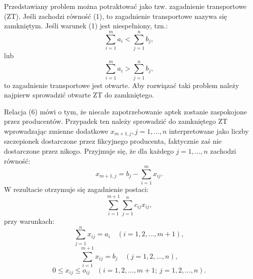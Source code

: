 \documentclass[11pt]{article}
\begin{document}
Przedstawiany problem można potraktować jako tzw. zagadnienie transportowe (ZT). Jeśli zachodzi równość (1), to zagadnienie transportowe nazywa się zamkniętym.
Jeśli warunek (1) jest niespełniony, tzn.:
\begin{equation}
    \sum\limits_{i=1}^{m} a_{i} < \sum\limits_{j=1}^n b_{j},
\end{equation}
lub
\begin{equation}
    \sum\limits_{i=1}^{m} a_{i} > \sum\limits_{j=1}^n b_{j},
\end{equation}
to zagadnienie transportowe jest otwarte. Aby rozwiązać taki problem należy najpierw sprowadzić otwarte ZT do zamkniętego.

Relacja (6) mówi o tym, że niecałe zapotrzebowanie aptek zostanie zaspokojone przez producentów. Przypadek ten należy sprowadzić do zamkniętego ZT wprowadzając zmienne dodatkowe $x_{m+1,j}, j = 1,..., n$ interpretowane jako liczby szczepionek dostarczone przez fikcyjnego producenta, faktycznie zaś nie dostarczone przez nikogo. Przyjmuje się, że dla każdego $j=1,..., n$ zachodzi równość:
\begin{equation}
    x_{m+1,j}=b_{j}-\sum\limits_{i=1}^{m} x_{ij}.
\end{equation}
W rezultacie otrzymuje się zagadnienie postaci:
\begin{equation}
    \sum\limits_{i=1}^{m+1}\sum\limits_{j=1}^{n}c_{ij}x_{ij},
\end{equation}
przy warunkach:
\begin{equation}
    \sum\limits_{j=1}^{n} x_{ij} = a_{i} \quad (i = 1, 2,..., m+1),
\end{equation}
\begin{equation}
    \sum\limits_{i=1}^{m+1} x_{ij} = b_{j} \quad (j = 1, 2,..., n),
\end{equation}
\begin{equation}
    0 \leq x_{ij} \leq o_{ij} \quad (i = 1, 2,..., m+1; \ j = 1, 2,..., n).
\end{equation}
\end{document}
